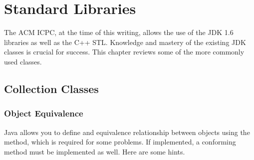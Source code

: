 \chapter{Standard Libraries}

The ACM ICPC, at the time of this writing, allows the use of the JDK 1.6 libraries as well
as the C++ STL.  Knowledge and mastery of the existing JDK classes is crucial for success.
This chapter reviews some of the more commonly used classes.

\section{Collection Classes}

\subsection{Object Equivalence}
\label{sec:objequivalence}

Java allows you to define and equivalence relationship between objects using the
 method, which is required for some problems.  If implemented,
a conforming  method must be implemented as well.
Here are some hints.

